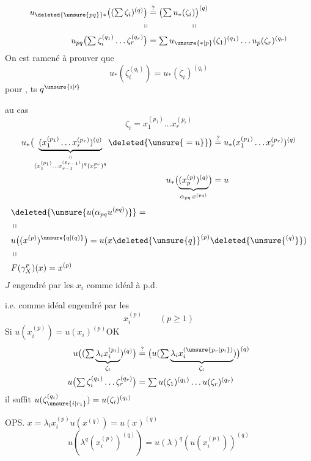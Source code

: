 \[
\begin{aligned}
u_{\deleted{\unsure{pq}}*}\bigl((\textstyle\sum\zeta_i)^{(q)}\bigr)&\overset{?}{=}\bigl(\textstyle\sum u_*(\zeta_i)\bigr)^{(q)}\\
\shortparallel&\hspace{5em}\shortparallel\\
u_{pq}\bigl(\textstyle\sum\zeta_i^{(q_1)}\ldots\zeta_r^{(q_r)}\bigr)&=\textstyle\sum u_{\unsure{*|p}}(\zeta_1)^{(q_1)}\ldots u_p(\zeta_r)^{(q_r)}
\end{aligned}
\]
On est ramené à prouver que
\[
u_*(\zeta_i^{(q_i)})=u_*(\zeta_i)^{(q_i)}
\]
pour  , ts $q^{\unsure{i|\prime}}$

  au cas
\[
\zeta_i=x_1^{(p_1)}\ldots x_r^{(p_r)}
\]
\[
\begin{aligned}
u_*\bigl(\underbrace{(x_1^{(p_1)}\ldots x_r^{(p_r)})^{(q)}}_{\substack{\shortparallel\\(x_1^{(p_1)}\ldots x_{r-1}^{(p_{r-1})})^q(x_r^{p_r})^q}}\deleted{\unsure{{}=u}}\bigr)
&\overset{?}{=}u_*(x_1^{(p_1)}\ldots x_r^{(p_r)})^{(q)}\\
u_*\bigl(\underbrace{(x_{p}^{(p)})^{(q)}}_{\alpha_{pq}\,x^{(pq)}}\bigr)&=u
\end{aligned}
\]
\[
\begin{aligned}
&\deleted{\unsure{u(\alpha_{pq}u^{(pq)})}}={}\\
&\shortparallel\\
&u\bigl((x^{(p)})^{\unsure{q|(q)}}\bigr)=u(x\deleted{\unsure{q}}^{(p)}\deleted{\unsure{^{(q)}}})\\
&\shortparallel\\
&F(\gamma_X^p)(x)=x^{(p)}
\end{aligned}
\]
$J$ engendré par les $x_i$ comme idéal à p.d.

i.e. comme idéal engendré par les
\[
x_i^{(p)}\qquad(p\geqslant1)
\]
Si $u(x_i^{(p)})=u(x_i)^{(p)}$\qquad OK
\[
\begin{aligned}
u\bigl((\textstyle\sum\underbrace{\lambda_i x_i^{(p_i)}}_{\zeta_i})^{(q)}\bigr)
&\overset{?}{=}\bigl(u(\textstyle\sum\underbrace{\lambda_i x_i^{(\unsure{p_r|p_i})}}_{\zeta_i})\bigr)^{(q)}\\
u\bigl(\textstyle\sum\zeta_i^{(q_1)}\ldots\zeta_r^{(q_r)}\bigr)
&=\textstyle\sum u(\zeta_1)^{(q_1)}\ldots u(\zeta_r)^{(q_r)}
\end{aligned}
\]
il suffit $u(\zeta_{\unsure{i|r_1}}^{(q_i)})=u(\zeta_i)^{(q_i)}$

OPS. \quad $x=\lambda_i x_i^{(p)}$\qquad $u(x^{(q)})=u(x)^{(q)}$
\[
u(\lambda^q(x_i^{(p)})^{(q)})=u(\lambda)^q(u(x_i^{(p)}))^{(q)}
\]
